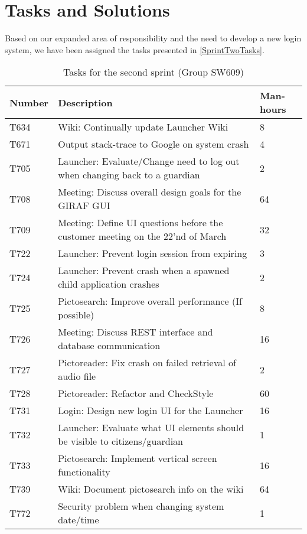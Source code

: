 \section{Tasks and Solutions}
Based on our expanded area of responsibility and the need to develop a new login
system, we have been assigned the tasks presented in \autoref{SprintTwoTasks}.

\begin{table}[H]
\centering
\begin{tabular}{|l|p{10cm}|l|}
\hline
Number	& Description & Man-hours												\\\hline
T634  	& Wiki: Continually update Launcher Wiki & 8\\\hline 
T671    & Output stack-trace to Google on system crash & 4
\\\hline 
T705	& Launcher: Evaluate/Change need to log out when changing back to a
guardian & 2 \\\hline 
T708    & Meeting: Discuss overall design goals for the GIRAF GUI & 64\\\hline
T709	& Meeting: Define UI questions before the customer meeting on the
22'nd of March & 32 \\\hline 
T722   	& Launcher: Prevent login session from expiring & 3 \\\hline 
T724   	& Launcher: Prevent crash when a spawned child application crashes &
2\\\hline T725  	& Pictosearch: Improve overall performance (If possible)	& 8 \\\hline 
T726    & Meeting: Discuss REST interface and database communication & 16
\\\hline 
T727    & Pictoreader: Fix crash on failed retrieval of audio file  & 2				\\\hline 
T728	& Pictoreader: Refactor and CheckStyle  & 60\\\hline
T731    & Login: Design new login UI for the Launcher & 16     			\\\hline
T732    & Launcher: Evaluate what UI elements should be visible to
citizens/guardian & 1\\\hline 
T733    & Pictosearch: Implement vertical screen functionality & 16   		
\\\hline 
T739    & Wiki: Document pictosearch info on the wiki & 64	\\\hline
T772    & Security problem when changing system date/time & 1 \\\hline
\end{tabular}
\caption{Tasks for the second sprint (Group SW609)} 
\label{SprintTwoTasks}    
\end{table} 

